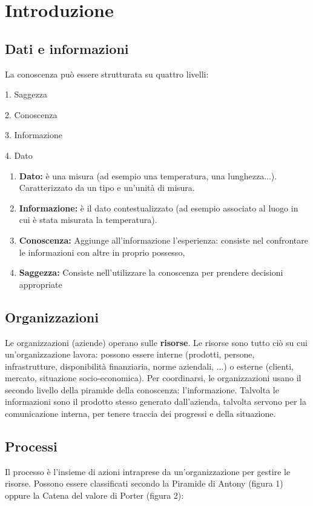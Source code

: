 \documentclass[\main/main.tex]{subfiles}
\begin{document}
\section{Introduzione}
\subsection{Dati e informazioni}
La conoscenza può essere strutturata su quattro livelli:

\begin{center}
1. Saggezza

2. Conoscenza 

3. Informazione

4. Dato
\end{center}


\begin{enumerate}
\item \textbf{Dato:} è una misura (ad esempio una temperatura, una lunghezza...). Caratterizzato da un tipo e un'unità di misura.
\item \textbf{Informazione:} è il dato contestualizzato (ad esempio associato al luogo in cui è stata misurata la temperatura). 
\item \textbf{Conoscenza:} Aggiunge all'informazione l'esperienza: consiste nel confrontare le informazioni con altre in proprio possesso, 
\item \textbf{Saggezza:} Consiste nell'utilizzare la conoscenza per prendere decisioni appropriate
\end{enumerate}

\subsection{Organizzazioni}
Le organizzazioni (aziende) operano sulle \textbf{risorse}. Le risorse sono tutto ciò su cui un'organizzazione lavora: possono essere interne (prodotti, persone, infrastrutture, disponibilità finanziaria, norme aziendali, ...) o esterne (clienti, mercato, situazione socio-economica).
Per coordinarsi, le organizzazioni usano il secondo livello della piramide della conoscenza: l'informazione. Talvolta le informazioni sono il prodotto stesso generato dall'azienda, talvolta servono per la comunicazione interna, per tenere traccia dei progressi e della situazione. 

\subsection{Processi}
Il processo è l'insieme di azioni intraprese da un'organizzazione per gestire le risorse. 
Possono essere classificati secondo la Piramide di Antony (figura 1) oppure la Catena del valore di Porter (figura 2):
\end{document}
